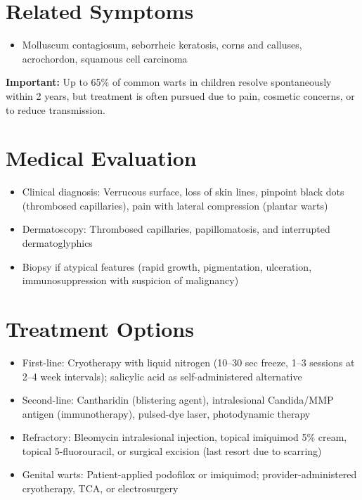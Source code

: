 \section*{Related Symptoms}
\begin{itemize}
  \item Molluscum contagiosum, seborrheic keratosis, corns and calluses, acrochordon, squamous cell carcinoma
\end{itemize}
\textbf{Important:} Up to 65\% of common warts in children resolve spontaneously within 2 years, but treatment is often pursued due to pain, cosmetic concerns, or to reduce transmission.

\section*{Medical Evaluation}
\begin{itemize}
  \item Clinical diagnosis: Verrucous surface, loss of skin lines, pinpoint black dots (thrombosed capillaries), pain with lateral compression (plantar warts)
  \item Dermatoscopy: Thrombosed capillaries, papillomatosis, and interrupted dermatoglyphics
  \item Biopsy if atypical features (rapid growth, pigmentation, ulceration, immunosuppression with suspicion of malignancy)
\end{itemize}

\section*{Treatment Options}
\begin{itemize}
  \item First-line: Cryotherapy with liquid nitrogen (10--30 sec freeze, 1--3 sessions at 2--4 week intervals); salicylic acid as self-administered alternative
  \item Second-line: Cantharidin (blistering agent), intralesional Candida/MMP antigen (immunotherapy), pulsed-dye laser, photodynamic therapy
  \item Refractory: Bleomycin intralesional injection, topical imiquimod 5\% cream, topical 5-fluorouracil, or surgical excision (last resort due to scarring)
  \item Genital warts: Patient-applied podofilox or imiquimod; provider-administered cryotherapy, TCA, or electrosurgery
\end{itemize}

